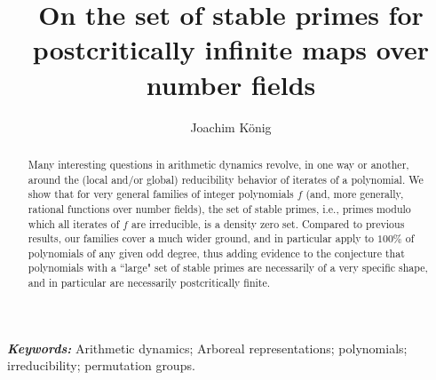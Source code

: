 \documentclass[a4paper]{amsart}
\begin{document}
\providecommand{\keywords}[1]{\textbf{\textit{Keywords: }} #1}
%
\newtheorem{theorem}{Theorem}[section]
\newtheorem{lemma}[theorem]{Lemma}
\newtheorem{proposition}[theorem]{Proposition}
\newtheorem{corollary}[theorem]{Corollary}
\newtheorem{problem}[theorem]{Problem}
\newtheorem{question}[theorem]{Question}
\newtheorem{conjecture}[theorem]{Conjecture}
\newtheorem{claim}[theorem]{Claim}
\newtheorem{condition}[theorem]{Condition}

%
\theoremstyle{definition}
\newtheorem{definition}[theorem]{Definition} %
\theoremstyle{remark}
\newtheorem{remark}[theorem]{Remark}
\newtheorem{example}[theorem]{Example}
\newtheorem{condenum}{Condition}

\def\p{\mathfrak{p}}
\def\q{\mathfrak{q}}
\def\s{\mathfrak{S}}
\def\Gal{\mathrm{Gal}}
\def\Ker{\mathrm{Ker}}
\def\soc{\mathrm{soc}}
\def\Coker{\mathrm{Coker}}
\newcommand{\cc}{{\mathbb{C}}}   
\newcommand{\ff}{{\mathbb{F}}}  
\newcommand{\nn}{{\mathbb{N}}}   
\newcommand{\qq}{{\mathbb{Q}}}  
\newcommand{\rr}{{\mathbb{R}}}   
\newcommand{\zz}{{\mathbb{Z}}}  
\def\K{\kappa}


\title{On the set of stable primes for postcritically infinite maps over number fields}
\author{Joachim K\"onig}
\address{Department of Mathematics Education, Korea National University of Education, Cheongju 28173, South Korea}
\begin{abstract}
Many interesting questions in arithmetic dynamics revolve, in one way or another, around the (local and/or global) reducibility behavior of iterates of a polynomial. We show that for very general families of integer polynomials $f$ (and, more generally, rational functions over number fields), the set of stable primes, i.e., primes modulo which all iterates of $f$ are irreducible, is a density zero set. Compared to previous results, our families cover a much wider ground, and in particular apply to $100\%$ of polynomials of any given odd degree, thus adding evidence to the conjecture that polynomials with a ``large" set of stable primes are necessarily of a very specific shape, and in particular are necessarily postcritically finite.
\end{abstract}
\keywords{Arithmetic dynamics; Arboreal representations; polynomials; irreducibility; permutation groups.}
\maketitle
\end{document}
